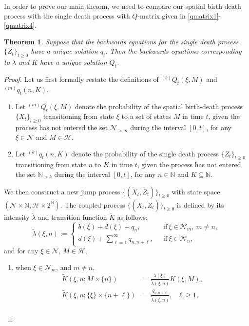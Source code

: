 \documentclass[12pt]{article}
\newtheorem{thm}{Theorem}[section]
\newcommand{\leftsup}[2]{{}^{#1}\! #2}%
\newcommand{\N}{\mathbb{N}}
\newcounter{con}%
\numberwithin{equation}{section}
\begin{document}
In order to prove our main theorm, we need to compare our spatial birth-death process with the single death process with $Q$-matrix given in \eqref{qmatrix1}-\eqref{qmatrix4}.
\begin{thm}\label{thm-uni1}
	Suppose that the backwards equations for the single death process $\{Z_t\}_{t\ge0}$ have a unique solution $q_t$. Then the backwards equations corresponding to $\lambda$ and $K$ have a unique solution $Q_t$.
\end{thm}
\begin{proof}
Let us first formally restate the definitions of $\leftsup{(b)}{Q}_t(\xi,M)$ and $\leftsup{(m)}{q}_t(n,K)$.
\begin{enumerate}
	\item Let $\leftsup{(m)}{Q}_t(\xi,M)$ denote the probability of the spatial birth-death process $\{X_t\}_{t\ge0}$ transitioning from state $\xi$ to a set of states $M$ in time $t$, given the process has not entered the set $\mathcal{N}_{>m}$ during the interval $[0, t]$, for any $\xi\in\mathcal{N}$ and $M\in\mathscr{H}$.
	\item Let $\leftsup{(k)}{q}_t(n,K)$ denote the probability of the single death process $\{Z_t\}_{t\ge0}$ transitioning from state $n$ to $K$ in time $t$, given the process has not entered the set $\N_{>k}$ during the interval $[0, t]$, for any $n\in\N$ and $K\subseteq\N$.
\end{enumerate}
We then construct a new jump process $\{(\tilde{X}_t,\tilde{Z}_t)\}_{t\ge0}$ with state space $(\mathcal{N}\times\N,\mathscr{H}\times 2^{\N})$.
The coupled process $\{(\tilde{X}_t,\tilde{Z}_t)\}_{t\ge0}$ is defined by its intensity $\tilde{\lambda}$ and transition function $\tilde{K}$ as follows:
\begin{equation}
	\tilde{\lambda}(\xi,n):=
\begin{cases}
	b(\xi)+d(\xi)+q_n,\ \ \ &\mbox{if}~\xi\in\mathcal{N}_m,~m\ne n,\\
	d(\xi)+\sum_{\ell=1}^{\infty}q_{n,n+\ell},\ \ \ &\mbox{if}~\xi\in\mathcal{N}_n,
\end{cases}
\end{equation}
and for any $\xi\in\mathcal{N}$, $M\in\mathscr{H}$, 
\begin{enumerate}
	\item when $\xi\in\mathcal{N}_m$, and $m\ne n$, 
\begin{align}
	\tilde{K}(\xi,n;M\times\{n\})&=\frac{\lambda(\xi)}{\tilde{\lambda}(\xi,n)}K(\xi,M),\nonumber\\
	\tilde{K}(\xi,n;\{\xi\}\times\{n+\ell\})&=\frac{q_{n,n+\ell}}{\tilde{\lambda}(\xi,n)},~~~\ell\ge1,\\

\end{align}
\end{enumerate}
\end{proof}
\end{document}
